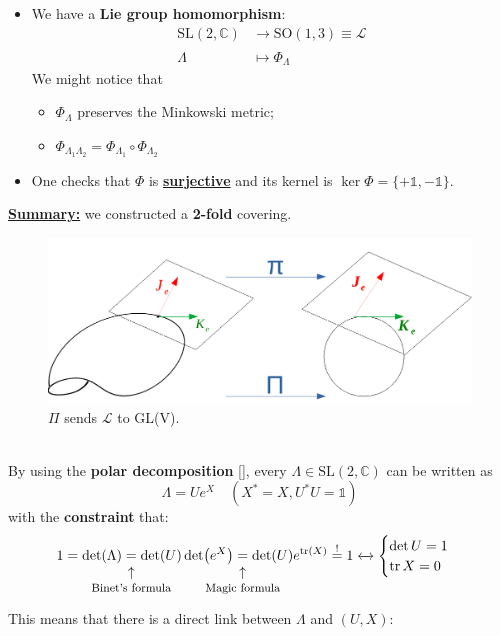 \documentclass[../main.tex]{subfiles}
\begin{document}
\begin{itemize}
    \item We have a \textbf{Lie group homomorphism}:
    \begin{align*}
    \text{SL}(2,\mathbb{C})&\xrightarrow[]{}\text{SO}(1,3)\equiv\mathcal{L}\\
    \Lambda&\mapsto\Phi_\Lambda
    \end{align*}
    We might notice that
    \begin{itemize}
        \item $\Phi_\Lambda$ preserves the Minkowski metric;\\
        \item $\Phi_{\Lambda_1\Lambda_2}=\Phi_{\Lambda_1}\circ\Phi_{\Lambda_2}$
    \end{itemize}
    \item One checks that $\Phi$ is \underline{\textbf{surjective}} and its kernel is $\ker\Phi=\{+\mathbb{1},-\mathbb{1}\}$.
\end{itemize}
\underline{\textbf{Summary:}} we constructed a \textbf{2-fold} covering.
\begin{figure}[h!]
    \centering
    \includegraphics{images/2_fold_covering.pdf}
    \caption{$\Pi$ sends $\mathcal{L}$ to GL(V).}
\end{figure}\\
By using the \textbf{polar decomposition} [], every $\Lambda\in\textrm{SL}(2,\mathbb{C})$ can be written as
\[
\Lambda=Ue^X \quad (X^*=X,U^*U=\mathbb{1})
\]
with the \textbf{constraint} that:
\[
1=\det(\Lambda)\underset{\mathclap{\tikz \node {$\uparrow$} node [below=1ex] {\footnotesize Binet's formula };}}=\det(U)\det (e^X)\underset{\mathclap{\tikz \node {$\uparrow$} node [below=1ex] {\footnotesize Magic formula };}}=\det(U)e^{\tr(X)}\overset{!}{=}1 \xleftrightarrow[]{}\begin{cases}
\det U=1\\
\tr X=0
\end{cases}
\]
This means that there is a direct link between $\Lambda$ and $(U,X)$:
\end{document}
